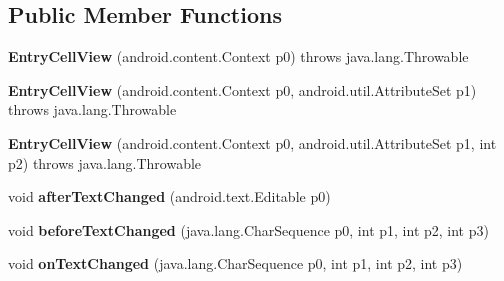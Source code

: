 \subsection*{Public Member Functions}
\begin{DoxyCompactItemize}
\item 
\hypertarget{classmd5282f1122c1313907b9bf274dd2c2f344_1_1EntryCellView_a1d7c9eb838db73af6ed0b954876c6881}{}{\bfseries Entry\+Cell\+View} (android.\+content.\+Context p0)  throws java.\+lang.\+Throwable 	\label{classmd5282f1122c1313907b9bf274dd2c2f344_1_1EntryCellView_a1d7c9eb838db73af6ed0b954876c6881}

\item 
\hypertarget{classmd5282f1122c1313907b9bf274dd2c2f344_1_1EntryCellView_a653aba07e96f33881ae18bb25dfe13b0}{}{\bfseries Entry\+Cell\+View} (android.\+content.\+Context p0, android.\+util.\+Attribute\+Set p1)  throws java.\+lang.\+Throwable 	\label{classmd5282f1122c1313907b9bf274dd2c2f344_1_1EntryCellView_a653aba07e96f33881ae18bb25dfe13b0}

\item 
\hypertarget{classmd5282f1122c1313907b9bf274dd2c2f344_1_1EntryCellView_a486f9b71b01314a650bc923d69658f32}{}{\bfseries Entry\+Cell\+View} (android.\+content.\+Context p0, android.\+util.\+Attribute\+Set p1, int p2)  throws java.\+lang.\+Throwable 	\label{classmd5282f1122c1313907b9bf274dd2c2f344_1_1EntryCellView_a486f9b71b01314a650bc923d69658f32}

\item 
\hypertarget{classmd5282f1122c1313907b9bf274dd2c2f344_1_1EntryCellView_aa6669f2ae32cff419192b12ebb9fe827}{}void {\bfseries after\+Text\+Changed} (android.\+text.\+Editable p0)\label{classmd5282f1122c1313907b9bf274dd2c2f344_1_1EntryCellView_aa6669f2ae32cff419192b12ebb9fe827}

\item 
\hypertarget{classmd5282f1122c1313907b9bf274dd2c2f344_1_1EntryCellView_a28b8f446d50578f4c5d7cc1e3348986d}{}void {\bfseries before\+Text\+Changed} (java.\+lang.\+Char\+Sequence p0, int p1, int p2, int p3)\label{classmd5282f1122c1313907b9bf274dd2c2f344_1_1EntryCellView_a28b8f446d50578f4c5d7cc1e3348986d}

\item 
\hypertarget{classmd5282f1122c1313907b9bf274dd2c2f344_1_1EntryCellView_a9a6897e16353c3448c0e515b7b4ebe61}{}void {\bfseries on\+Text\+Changed} (java.\+lang.\+Char\+Sequence p0, int p1, int p2, int p3)\label{classmd5282f1122c1313907b9bf274dd2c2f344_1_1EntryCellView_a9a6897e16353c3448c0e515b7b4ebe61}


\end{DoxyCompactItemize}
